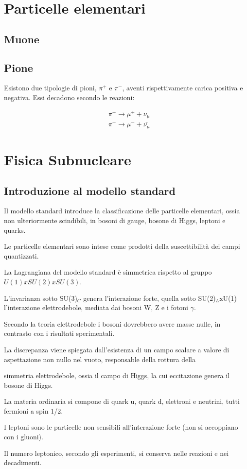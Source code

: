 \documentclass{article}
\begin{document}
\section{Particelle elementari}

\subsection{Muone}

\subsection{Pione}

Esistono due tipologie di pioni, $\pi^+$ e $\pi^-$, aventi rispettivamente carica positiva e negativa.
Essi decadono secondo le reazioni:

\begin{equation}
    \begin{aligned}
         & \pi^+\rightarrow \mu^++\nu_{\mu}       \\
         & \pi^-\rightarrow \mu^-+\bar{\nu_{\mu}}
    \end{aligned}
\end{equation}

\section{Fisica Subnucleare}

\subsection{Introduzione al modello standard}

Il modello standard introduce la classificazione delle particelle elementari, ossia non ulteriormente scindibili, in bosoni di gauge, bosone di Higgs, leptoni e quarks.

Le particelle elementari sono intese come prodotti della suscettibilità dei campi quantizzati.

La Lagrangiana del modello standard è simmetrica rispetto al gruppo $U(1)xSU(2)xSU(3)$.

L'invarianza sotto SU(3)$_C$ genera l'interazione forte, quella sotto SU(2)$_L$xU(1) l'interazione elettrodebole, mediata dai bosoni W, Z e i fotoni $\gamma$.

Secondo la teoria elettrodebole i bosoni dovrebbero avere masse nulle, in contrasto con i risultati sperimentali.

La discrepanza viene spiegata dall'esistenza di un campo scalare a valore di aspettazione non nullo nel vuoto, responsable della rottura della

simmetria elettrodebole, ossia il campo di Higgs, la cui eccitazione genera il bosone di Higgs.

La materia ordinaria si compone di quark u, quark d, elettroni e neutrini, tutti fermioni a spin 1/2.

I leptoni sono le particelle non sensibili all'interazione forte (non si accoppiano con i gluoni).

Il numero leptonico, secondo gli esperimenti, si conserva nelle reazioni e nei decadimenti.
\end{document}
